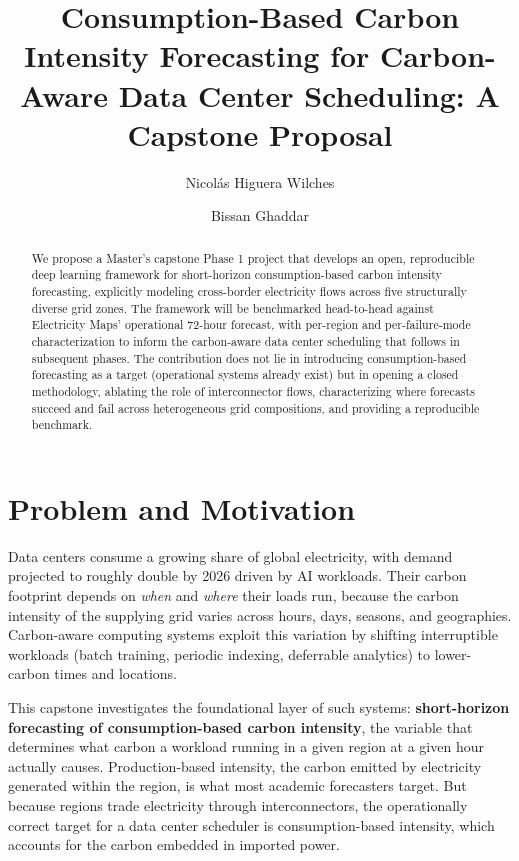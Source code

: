 \documentclass[sigconf,nonacm]{acmart}
\title{Consumption-Based Carbon Intensity Forecasting for Carbon-Aware Data Center Scheduling: A Capstone Proposal}
\author{Nicol\'as Higuera Wilches}
\affiliation{
  \institution{IE University, School of Science and Technology}
  \city{Madrid}
  \country{Spain}
}
\author{Bissan Ghaddar}
\affiliation{
  \institution{Advisor, IE University}
  \city{Madrid}
  \country{Spain}
}
\begin{document}
\begin{abstract}
We propose a Master's capstone Phase 1 project that develops an open, reproducible deep learning framework for short-horizon consumption-based carbon intensity forecasting, explicitly modeling cross-border electricity flows across five structurally diverse grid zones. The framework will be benchmarked head-to-head against Electricity Maps' operational 72-hour forecast, with per-region and per-failure-mode characterization to inform the carbon-aware data center scheduling that follows in subsequent phases. The contribution does not lie in introducing consumption-based forecasting as a target (operational systems already exist) but in opening a closed methodology, ablating the role of interconnector flows, characterizing where forecasts succeed and fail across heterogeneous grid compositions, and providing a reproducible benchmark.
\end{abstract}

\maketitle

\section{Problem and Motivation}

Data centers consume a growing share of global electricity, with demand projected to roughly double by 2026 driven by AI workloads. Their carbon footprint depends on \emph{when} and \emph{where} their loads run, because the carbon intensity of the supplying grid varies across hours, days, seasons, and geographies. Carbon-aware computing systems exploit this variation by shifting interruptible workloads (batch training, periodic indexing, deferrable analytics) to lower-carbon times and locations.

This capstone investigates the foundational layer of such systems: \textbf{short-horizon forecasting of consumption-based carbon intensity}, the variable that determines what carbon a workload running in a given region at a given hour actually causes. Production-based intensity, the carbon emitted by electricity generated within the region, is what most academic forecasters target. But because regions trade electricity through interconnectors, the operationally correct target for a data center scheduler is consumption-based intensity, which accounts for the carbon embedded in imported power.
\end{document}
